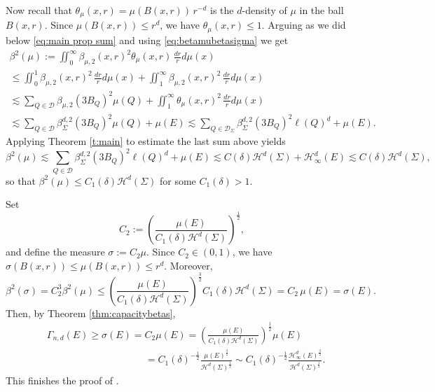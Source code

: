 \documentclass[11pt,reqno]{amsart}
\theoremstyle{definition}
\theoremstyle{remark}
\numberwithin{equation}{section}
\newcommand{\hd}{\mathcal{H}^d}
\newcommand{\hdc}{\mathcal{H}^d_\infty}
\newcommand{\dD}{\mathcal{D}}
\theoremstyle{theorem}
\theoremstyle{definition}
\theoremstyle{remark}
\numberwithin{equation}{section}
\begin{document}
	Now recall that $\theta_\mu(x,r)= \mu(B(x,r))\,r^{-d}$ is the $d$-density of $\mu$ in the ball $B(x,r)$. Since $\mu(B(x,r)) \le r^d$, we have $\theta_\mu(x,r) \le 1$. Arguing as we did below \eqref{eq:main prop sum} and using \eqref{eq:betamubetasigma} we get
	\begin{multline*}
	\beta^2(\mu) := \iint_0^{\infty} \beta_{\mu,2}(x,r)^2 \theta_\mu(x,r) \, \frac{dr}{r}d\mu(x)\\
	 \le \iint_0^{1} \beta_{\mu,2}(x,r)^2 \, \frac{dr}{r}d\mu(x)+\iint_1^{\infty} \beta_{\mu,2}(x,r)^2 \, \frac{dr}{r}d\mu(x) \\
	 \lesssim \sum_{Q\in \dD} \beta_{\mu,2}(3B_Q)^2 \mu(Q) + \iint_1^{\infty} \theta_\mu(x,r)^2 \, \frac{dr}{r}d\mu(x)\\
	 \lesssim \sum_{Q\in \dD} \beta_\Sigma^{d, 2}(3B_Q)^2 \mu(Q) + \mu(E) \lesssim \sum_{Q\in \dD_\Sigma} \beta_\Sigma^{d,2}(3B_Q)^2 \ell(Q)^d + \mu(E).
	\end{multline*}
	Applying Theorem \ref{t:main} to estimate the last sum above yields
	\begin{equation*}
	\beta^2(\mu)\lesssim\sum_{Q\in \dD} \beta_\Sigma^{d,2}(3B_Q)^2 \ell(Q)^d + \mu(E) \lesssim C(\delta)\hd(\Sigma)+\hdc(E)\lesssim C(\delta)\hd(\Sigma),
	\end{equation*}
	so that $\beta^2(\mu)\le C_1(\delta)\hd(\Sigma)$ for some $C_1(\delta)>1$.
	
	Set
	\begin{equation*}
	C_2:= \left( \frac{\mu(E)}{C_1(\delta) \hd(\Sigma)} \right)^{\frac{1}{2}},
	\end{equation*}	
	and define the measure $\sigma := C_2 \mu$. Since $C_2\in (0,1)$, we have $\sigma(B(x,r))\le\mu(B(x,r))\le r^d$. Moreover,
	\begin{equation*}
	\beta^2(\sigma) = C_2^3 \beta^2(\mu)  \leq  \left( \frac{\mu(E)}{C_1(\delta) \hd(\Sigma)} \right)^{\frac{3}{2}} C_1(\delta) \hd(\Sigma) = C_2\, \mu(E)=\sigma(E).
	\end{equation*}
	Then, by Theorem \ref{thm:capacitybetas}, 
	\begin{align*}
	&\Gamma_{n,d} (E) \geq \sigma(E) = C_2 \mu(E) = \left( \frac{\mu(E)}{C_1(\delta) \hd(\Sigma)} \right)^{\frac{1}{2}} \mu(E) \\
	& \qquad \qquad \qquad \qquad \qquad = C_1(\delta)^{-\frac{1}{2}} \frac{\mu(E)^{\frac{3}{2}}}{\hd(\Sigma)^{\frac{1}{2}}} \sim C_1( \delta)^{-\frac{1}{2}} \frac{\hdc(E)^{\frac{3}{2}}}{\hd(\Sigma)^{\frac{1}{2}}}.
	\end{align*}
	This finishes the proof of .
\end{document}
